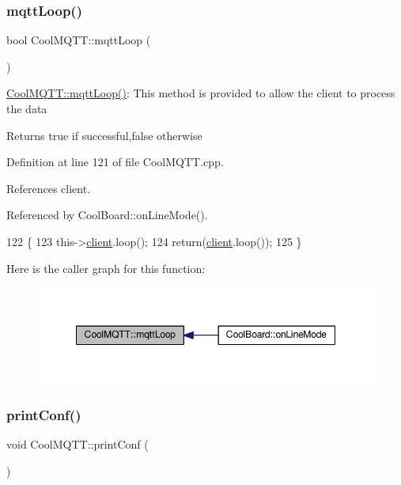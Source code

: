 \subsubsection{\texorpdfstring{mqtt\+Loop()}{mqttLoop()}}
{\footnotesize\ttfamily bool Cool\+M\+Q\+T\+T\+::mqtt\+Loop (\begin{DoxyParamCaption}{ }\end{DoxyParamCaption})}

\hyperlink{classCoolMQTT_aa5eaae967b562b62cbcf2b8d81f6e5d5}{Cool\+M\+Q\+T\+T\+::mqtt\+Loop()}\+: This method is provided to allow the client to process the data

\begin{DoxyReturn}{Returns}
true if successful,false otherwise 
\end{DoxyReturn}


Definition at line 121 of file Cool\+M\+Q\+T\+T.\+cpp.



References client.



Referenced by Cool\+Board\+::on\+Line\+Mode().


\begin{DoxyCode}
122 \{
123     this->\hyperlink{classCoolMQTT_a4ca71e4f76ef868692a297efd45b1415}{client}.loop();
124     \textcolor{keywordflow}{return}(\hyperlink{classCoolMQTT_a4ca71e4f76ef868692a297efd45b1415}{client}.loop());
125 \}
\end{DoxyCode}
Here is the caller graph for this function\+:
\nopagebreak
\begin{figure}[H]
\begin{center}
\leavevmode
\includegraphics[width=348pt]{classCoolMQTT_aa5eaae967b562b62cbcf2b8d81f6e5d5_icgraph}
\end{center}
\end{figure}
\mbox{\label{classCoolMQTT_a40553a0ad4b5ecf1cb4411ab54ca85fb}} 
\subsubsection{\texorpdfstring{print\+Conf()}{printConf()}}
{\footnotesize\ttfamily void Cool\+M\+Q\+T\+T\+::print\+Conf (\begin{DoxyParamCaption}{ }\end{DoxyParamCaption})}

